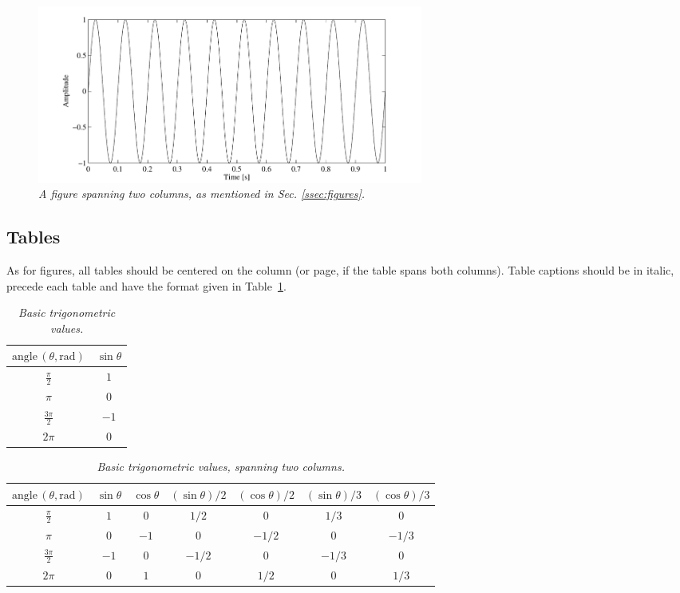 \documentclass[twoside,a4paper]{article}
\begin{document}
\begin{figure}[ht]
\center
\includegraphics[width=5in]{TwoColumnSine2}
\caption{\label{ftt_plot2}{\it A figure spanning two columns, as mentioned in
Sec. \ref{ssec:figures}.}}
\end{figure}

\subsection{Tables}

As for figures, all tables should be centered on the column (or page, if the
table spans both columns). Table captions should be in italic, precede each
table and have the format given in Table~\ref{tab:example}.

\begin{table}[ht]
  \caption{\itshape Basic trigonometric values.}
	\centering
	\begin{tabular}{|c|c|}
		\hline
		$\mathrm{angle}\,(\theta, \mathrm{rad})$ & $\sin \theta$ \\\hline
		$\frac{\pi}{2}$ & $1$ \\
		$\pi$ & $0$ \\
		$\frac{3\pi}{2}$ & $-1$ \\
		$2\pi$ & $0$ \\\hline
	\end{tabular}
	\label{tab:example}
\end{table}

\begin{table}[ht]
  \caption{{\it Basic trigonometric values, spanning two columns.}}
	\centering
  \begin{tabular}{|c|c|c|c|c|c|c|}\hline
    $\mathrm{angle}\, (\theta, \mathrm{rad})$ & $\sin \theta$ & $\cos \theta $ & $(\sin \theta)/2 $ & $(\cos \theta) /2 $ & $(\sin \theta)/3 $ & $(\cos \theta)/3$    \\\hline
    $\frac{\pi}{2}$ & $1$ & $0$ & $1/2$ & $0$ & $1/3$ & $0$ \\
    $\pi$ & $0$ & $-1$ & $0$ & $-1/2$ & $0$ & $-1/3$\\
    $\frac{3\pi}{2}$ & $-1$ & $0$ & $-1/2$ & $0$ & $-1/3$ & $0$ \\
    $2\pi$ & $0$ & $1$ & $0$ & $1/2$ & $0$ & $1/3$ \\\hline
 \end{tabular}
  \label{tab:example2}
\end{table}
\end{document}
